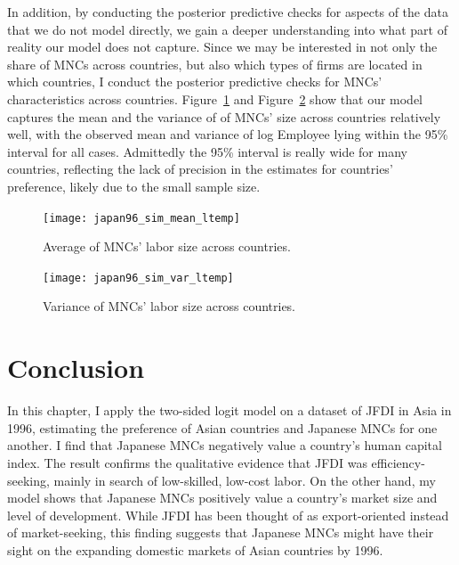 In addition, by conducting the posterior predictive checks for aspects of the
data that we do not model directly, we gain a deeper understanding into what
part of reality our model does not capture. Since we may be interested in
not only the share of MNCs across countries, but also which types of firms are
located in which countries, I conduct the posterior predictive checks for MNCs'
characteristics across countries. Figure~\ref{fig:japan96_sim_mean_ltemp} and
Figure~\ref{fig:japan96_sim_var_ltemp} show that our model captures the mean
and the variance of of MNCs' size across countries relatively well, with the
observed mean and variance of log Employee lying within the 95\% interval for all cases.
Admittedly the 95\% interval is really wide for many countries, reflecting the
lack of precision in the estimates for countries' preference, likely due to the
small sample size.

\begin{figure}[!ht] \centering
\texttt{[image: japan96\_sim\_mean\_ltemp]}
  \caption[Predicted and observed MNCs' size across countries.]{Average of MNCs' labor size across countries.}
  \label{fig:japan96_sim_mean_ltemp}
\end{figure}

\begin{figure}[!ht] \centering
\texttt{[image: japan96\_sim\_var\_ltemp]}
  \caption[Predicted and observed variance of MNCs' size across countries.]{Variance of MNCs' labor size across countries.}
  \label{fig:japan96_sim_var_ltemp}
\end{figure}

\section{Conclusion}

In this chapter, I apply the two-sided logit model on a dataset of JFDI in Asia
in 1996, estimating the preference of Asian countries and Japanese MNCs for one
another. I find that Japanese MNCs negatively value a country's human capital
index. The result confirms the qualitative evidence that JFDI was
efficiency-seeking, mainly in search of low-skilled, low-cost labor. On the
other hand, my model shows that Japanese MNCs positively value a country's
market size and level of development. While JFDI has been thought of as
export-oriented instead of market-seeking, this finding suggests that Japanese
MNCs might have their sight on the expanding domestic markets of Asian countries
by 1996.

